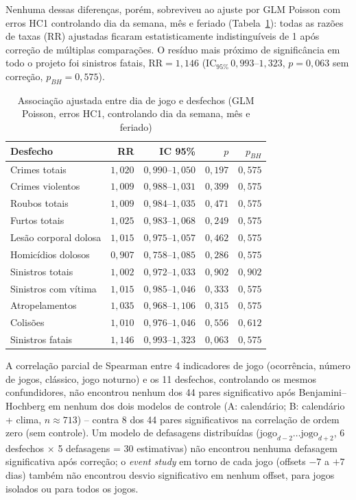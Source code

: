 \documentclass[12pt]{article}
\begin{document}
Nenhuma dessas diferenças, porém, sobreviveu ao ajuste por GLM Poisson
com erros HC1 controlando dia da semana, mês e feriado
(Tabela~\ref{tab:glm}): todas as razões de taxas (RR) ajustadas ficaram
estatisticamente indistinguíveis de 1 após correção de múltiplas
comparações. O resíduo mais próximo de significância em todo o projeto
foi sinistros fatais, $\text{RR}=1,146$ ($\text{IC}_{95\%}\,
0,993$--$1,323$, $p=0,063$ sem correção, $p_{BH}=0,575$).

\begin{table}[ht]
\centering
\caption{Associação ajustada entre dia de jogo e desfechos (GLM Poisson,
erros HC1, controlando dia da semana, mês e feriado)}
\label{tab:glm}
\small
\begin{tabular}{@{}lrrrr@{}}
\toprule
\textbf{Desfecho} & \textbf{RR} & \textbf{IC 95\%} & \textbf{$p$} & \textbf{$p_{BH}$} \\
\midrule
Crimes totais           & $1,020$ & $0,990$--$1,050$ & $0,197$ & $0,575$ \\
Crimes violentos        & $1,009$ & $0,988$--$1,031$ & $0,399$ & $0,575$ \\
Roubos totais           & $1,009$ & $0,984$--$1,035$ & $0,471$ & $0,575$ \\
Furtos totais           & $1,025$ & $0,983$--$1,068$ & $0,249$ & $0,575$ \\
Lesão corporal dolosa   & $1,015$ & $0,975$--$1,057$ & $0,462$ & $0,575$ \\
Homicídios dolosos      & $0,907$ & $0,758$--$1,085$ & $0,286$ & $0,575$ \\
Sinistros totais        & $1,002$ & $0,972$--$1,033$ & $0,902$ & $0,902$ \\
Sinistros com vítima    & $1,015$ & $0,985$--$1,046$ & $0,333$ & $0,575$ \\
Atropelamentos          & $1,035$ & $0,968$--$1,106$ & $0,315$ & $0,575$ \\
Colisões                & $1,010$ & $0,976$--$1,046$ & $0,556$ & $0,612$ \\
Sinistros fatais        & $1,146$ & $0,993$--$1,323$ & $0,063$ & $0,575$ \\
\bottomrule
\end{tabular}
\end{table}

A correlação parcial de Spearman entre 4 indicadores de jogo
(ocorrência, número de jogos, clássico, jogo noturno) e os 11 desfechos,
controlando os mesmos confundidores, não encontrou nenhum dos 44 pares
significativo após Benjamini--Hochberg em nenhum dos dois modelos de
controle (A: calendário; B: calendário + clima, $n\approx713$) --
contra 8 dos 44 pares significativos na correlação de ordem zero (sem
controle). Um modelo de defasagens distribuídas
($\text{jogo}_{d-2}\ldots\text{jogo}_{d+2}$, 6 desfechos $\times$ 5
defasagens = 30 estimativas) não encontrou nenhuma defasagem
significativa após correção; o \emph{event study} em torno de cada jogo
(offsets $-7$ a $+7$ dias) também não encontrou desvio significativo em
nenhum offset, para jogos isolados ou para todos os jogos.
\end{document}
